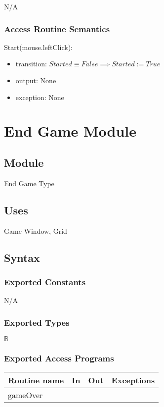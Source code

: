 \documentclass[12pt]{article}
\begin{document}
N/A

\subsubsection* {Access Routine Semantics}

\noindent Start(mouse.leftClick):
\begin{itemize}
\item transition: $ Started \equiv False \implies Started := True$
\item output: None
\item exception: None
\end{itemize}

\newpage

\section* {End Game Module}

\subsection*{Module}

End Game Type

\subsection* {Uses}

Game Window, Grid

\subsection* {Syntax}

\subsubsection* {Exported Constants}

N/A

\subsubsection* {Exported Types}

$\mathbb{B}$

\subsubsection* {Exported Access Programs}

\begin{tabular}{| l | l | l | l |}
\hline
\textbf{Routine name} & \textbf{In} & \textbf{Out} & \textbf{Exceptions}\\
\hline
gameOver &  &  & \\
\hline
\end{tabular}
\end{document}
